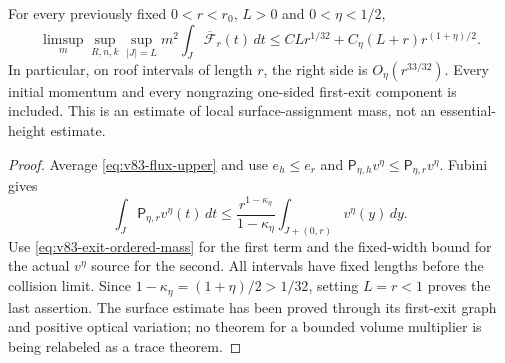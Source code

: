 \begin{theorem}
\label{thm:v83-surface-local-mass}
For every previously fixed $0<r<r_0$, $L>0$ and $0<\eta<1/2$,
\begin{equation}\label{eq:v83-surface-local-mass}
 \limsup_m\sup_{R,n,k}\sup_{|J|=L}m^2
       \int_J\overline{\mathcal F}_r(t)\,dt
 \le C Lr^{1/32}+C_\eta(L+r)r^{(1+\eta)/2}.
\end{equation}
In particular, on roof intervals of length $r$, the right side is
$O_\eta(r^{33/32})$. Every initial momentum and every nongrazing
one-sided first-exit component is included. This is an estimate of
local surface-assignment mass, not an essential-height estimate.
\end{theorem}
\begin{proof}
Average \eqref{eq:v83-flux-upper} and use $e_h\le e_r$ and
$\mathsf P_{\eta,h}v^\eta\le\mathsf P_{\eta,r}v^\eta$. Fubini gives
\[
 \int_J\mathsf P_{\eta,r}v^\eta(t)\,dt
 \le\frac{r^{1-\kappa_\eta}}{1-\kappa_\eta}
                                  \int_{J+(0,r)}v^\eta(y)\,dy.
\]
Use \eqref{eq:v83-exit-ordered-mass} for the first term and the
fixed-width bound for the actual $v^\eta$ source for the second.
All intervals have fixed lengths before the collision limit.
Since $1-\kappa_\eta=(1+\eta)/2>1/32$, setting $L=r<1$ proves
the last assertion. The surface estimate has been proved through
its first-exit graph and positive optical variation; no theorem
for a bounded volume multiplier is being relabeled as a trace theorem.
\end{proof}
